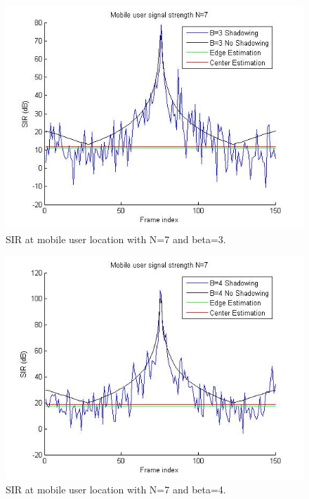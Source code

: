 \documentclass{article}
\begin{document}
\begin{figure}[h]
\centerline{\includegraphics[width=5in]{latex/images/N7B3.jpg}}
\caption{SIR at mobile user location with N=7 and beta=3.}
\label{N7B3}
\end{figure}

\begin{figure}[h]
\centerline{\includegraphics[width=5in]{latex/images/N7B4.jpg}}
\caption{SIR at mobile user location with N=7 and beta=4.}
\label{N7B4}
\end{figure}
\end{document}

